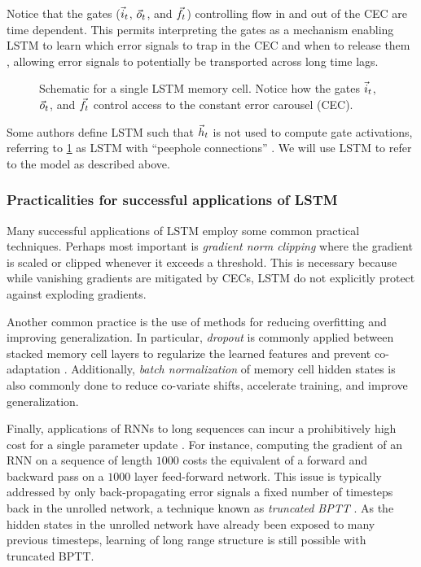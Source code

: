 Notice that the gates ($\vec{i}_t$, $\vec{o}_t$, and $\vec{f}_t$) controlling flow in and out
of the CEC are time dependent. This permits interpreting the gates as a
mechanism enabling LSTM to learn which error signals to trap in the CEC and
when to release them \citep{hochreiter1997long}, allowing error signals to
potentially be transported across long time lags.

\begin{figure}[tb]
    \centering
    
    \caption{Schematic for a single LSTM memory cell. Notice how the gates $\vec{i}_t$, $\vec{o}_t$, and $\vec{f}_t$ control access to the constant error carousel (CEC).}
    \label{fig:lstm-cell}
\end{figure}

Some authors define LSTM such that $\vec{h}_t$ is not used to compute gate
activations, referring to \cref{fig:lstm-cell} as LSTM with ``peephole
connections'' \citep{gers2000recurrent}. We will use LSTM to refer to the
model as described above.

\subsubsection{Practicalities for successful applications of LSTM}

Many successful applications of LSTM
\citep{devlin2014fast,zaremba2015empirical,pascanu2013construct} employ some
common practical techniques. Perhaps most important is \emph{gradient norm
clipping} \citep{Mikolov2012,Pascanu2012} where the gradient is scaled or
clipped whenever it exceeds a threshold. This is necessary because while
vanishing gradients are mitigated by CECs, LSTM do not explicitly protect
against exploding gradients.

Another common practice is the use of methods for reducing overfitting and
improving generalization. In particular, \emph{dropout}
\citep{hinton2012improving} is commonly applied between stacked memory cell
layers to regularize the learned features and prevent co-adaptation
\citep{zaremba2014recurrent}. Additionally, \emph{batch normalization}
\citep{ioffe2015batch} of memory cell hidden states is also commonly done to
reduce co-variate shifts, accelerate training, and improve generalization.

Finally, applications of RNNs to long sequences can incur a prohibitively high
cost for a single parameter update \citep{citeulike:13881859}. For instance,
computing the gradient of an RNN on a sequence of length $1000$ costs the
equivalent of a forward and backward pass on a $1000$ layer feed-forward
network. This issue is typically addressed by only back-propagating error
signals a fixed number of timesteps back in the unrolled network, a technique
known as \emph{truncated BPTT} \citep{williams1990efficient}. As the hidden
states in the unrolled network have already been exposed to many previous
timesteps, learning of long range structure is still possible with truncated
BPTT.


